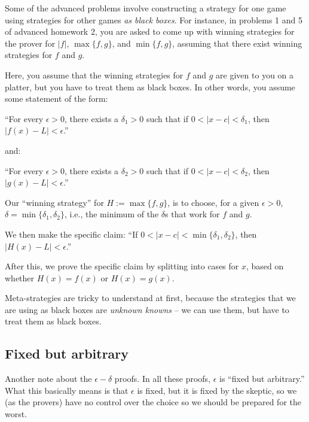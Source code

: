 \documentclass{amsart}
\begin{document}
Some of the advanced problems involve constructing a strategy for one
game using strategies for other games {\em as black boxes}. For
instance, in problems 1 and 5 of advanced homework 2, you are asked
to come up with winning strategies for the prover for $|f|$, $\max \{
f, g\}$, and $\min \{ f, g \}$, assuming that there exist winning
strategies for $f$ and $g$.

Here, you assume that the winning strategies for $f$ and $g$ are given
to you on a platter, but you have to treat them as black boxes. In
other words, you assume some statement of the form:

``For every $\epsilon > 0$, there exists a $\delta_1 > 0$ such that if
$0 < |x - c| < \delta_1$, then $|f(x) - L| < \epsilon$.''

and:

``For every $\epsilon > 0$, there exists a $\delta_2 > 0$ such that if
$0 < |x - c| < \delta_2$, then $|g(x) - L| < \epsilon$.''

Our ``winning strategy'' for $H := \max \{ f,g \}$, is to choose, for a
given $\epsilon > 0$, $\delta = \min \{ \delta_1, \delta_2\}$, i.e.,
the minimum of the $\delta$s that work for $f$ and $g$.

We then make the specific claim: ``If $0 < |x - c| < \min \{ \delta_1,
\delta_2 \}$, then $|H(x) - L| < \epsilon$.''

After this, we prove the specific claim by splitting into cases for
$x$, based on whether $H(x) = f(x)$ or $H(x) = g(x)$.

Meta-strategies are tricky to understand at first, because the
strategies that we are using as black boxes are {\em unknown knowns}
-- we can use them, but have to treat them as black boxes.

\subsection{Fixed but arbitrary}

Another note about the $\epsilon-\delta$ proofs. In all these proofs,
$\epsilon$ is ``fixed but arbitrary.'' What this basically means is
that $\epsilon$ is fixed, but it is fixed by the skeptic, so we (as
the provers) have no control over the choice so we should be prepared
for the worst.
\end{document}
